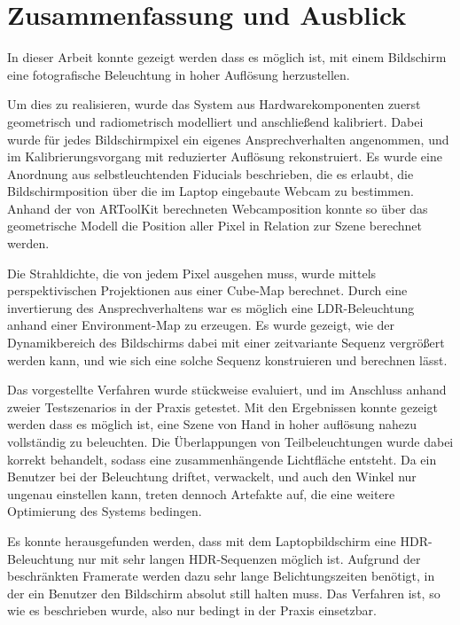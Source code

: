 
\chapter{Zusammenfassung und Ausblick} \label{zusammenfassung}
  
   In dieser Arbeit konnte gezeigt werden dass es möglich ist, mit einem Bildschirm eine fotografische Beleuchtung in hoher Auflösung herzustellen. 
 
   Um dies zu realisieren, wurde das System aus Hardwarekomponenten zuerst geometrisch und radiometrisch modelliert und anschließend kalibriert.
   Dabei wurde für jedes Bildschirmpixel ein eigenes Ansprechverhalten angenommen, und im Kalibrierungsvorgang mit reduzierter Auflösung rekonstruiert.
   Es wurde eine Anordnung aus selbstleuchtenden Fiducials beschrieben, die es erlaubt, die Bildschirmposition über die im Laptop eingebaute Webcam zu bestimmen.
   Anhand der von ARToolKit berechneten Webcamposition konnte so über das geometrische Modell die Position aller Pixel in Relation zur Szene berechnet werden.
   
   Die Strahldichte, die von jedem Pixel ausgehen muss, wurde mittels perspektivischen Projektionen aus einer Cube-Map berechnet.
   Durch eine invertierung des Ansprechverhaltens war es möglich eine LDR-Beleuchtung anhand einer Environment-Map zu erzeugen.
   Es wurde gezeigt, wie der Dynamikbereich des Bildschirms dabei mit einer zeitvariante Sequenz vergrößert werden kann, und wie sich eine solche Sequenz konstruieren und berechnen lässt.
   
   Das vorgestellte Verfahren wurde stückweise evaluiert, und im Anschluss anhand zweier Testszenarios in der Praxis getestet.
   Mit den Ergebnissen konnte gezeigt werden dass es möglich ist, eine Szene von Hand in hoher auflösung nahezu vollständig zu beleuchten.
   Die Überlappungen von Teilbeleuchtungen wurde dabei korrekt behandelt, sodass eine zusammenhängende Lichtfläche entsteht.
   Da ein Benutzer bei der Beleuchtung driftet, verwackelt, und auch den Winkel nur ungenau einstellen kann, treten dennoch Artefakte auf, die eine weitere Optimierung des Systems bedingen.  
 
   Es konnte herausgefunden werden, dass mit dem Laptopbildschirm eine HDR-Beleuchtung nur mit sehr langen HDR-Sequenzen möglich ist.
   Aufgrund der beschränkten Framerate werden dazu sehr lange Belichtungszeiten benötigt, in der ein Benutzer den Bildschirm absolut still halten muss.
   Das Verfahren ist, so wie es beschrieben wurde, also nur bedingt in der Praxis einsetzbar.

